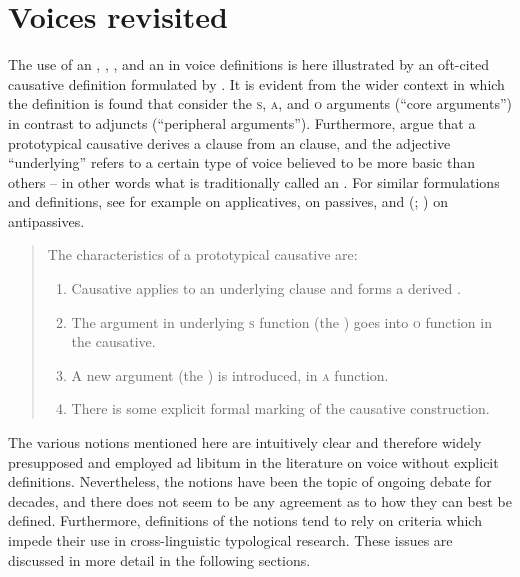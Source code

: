 \section{Voices revisited} \label{voices-revisited}
The use of an , , , and an  in voice definitions is here illustrated by an oft-cited causative definition formulated by \cite{dixon:aikhenvald:2000}. It is evident from the wider context in which the definition is found that \citeauthor{dixon:aikhenvald:2000} consider the  \textsc{s}, \textsc{a}, and \textsc{o} arguments (“core arguments”) in contrast to adjuncts (“peripheral arguments”). Furthermore, \citeauthor{dixon:aikhenvald:2000} argue that a prototypical causative derives a  clause from an  clause, and the adjective “underlying” refers to a certain type of voice believed to be more basic than others -- in other words what is traditionally called an . For similar formulations and definitions, see for example \cite[1f.]{peterson:2007} on applicatives, \cite[151f.]{siewierska:bakker:2012} on passives, and \citeauthor{heaton:2017} (\citeyear[63f.]{heaton:2017}; \citeyear[132ff.]{heaton:2020}) on antipassives. 

\begin{quote}
	The characteristics of a prototypical causative are:
	\begin{enumerate}[label=(\alph*)]
		\item Causative applies to an underlying  clause and forms a derived .
		\item The argument in underlying \textsc{s} function (the ) goes into \textsc{o} function in the causative.
		\item A new argument (the ) is introduced, in \textsc{a} function.
		\item There is some explicit formal marking of the causative construction.
		\begin{flushright}
			\citep[13]{dixon:aikhenvald:2000}
		\end{flushright}
	\end{enumerate}
\end{quote}

The various notions mentioned here are intuitively clear and therefore widely presupposed and employed ad libitum in the literature on voice without explicit definitions. Nevertheless, the notions have been the topic of ongoing debate for decades, and there does not seem to be any agreement as to how they can best be defined. Furthermore, definitions of the notions tend to rely on  criteria which impede their use in cross-linguistic typological research. These issues are discussed in more detail in the following sections.

